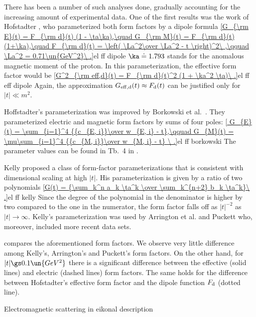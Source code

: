 There has been a number of such analyses done, gradually accounting for the increasing amount of experimental data. One of the first results was the work of Hofstadter , who parameterized both form factors by a dipole formula
\eqref{G_{\rm E}(t) = F_{\rm d}(t) (1 - \ta\ka),\quad G_{\rm M}(t) = F_{\rm d}(t) (1+\ka),\quad F_{\rm d}(t) = \left( \La^2\over \La^2 - t \right)^2\ ,\qquad \La^2 = 0.71\un{GeV^2}\ .}{el ff dipole}
$\ka\doteq 1.793$ stands for the anomalous magnetic moment of the proton. In this parameterization, the effective form factor would be
\eqref{G^2_{\rm eff,d}(t) = F_{\rm d}(t)^2 (1 + \ka^2 \ta)\ .}{el ff eff dipole}
Again, the approximation $G_{\rm eff,d}(t)\approx F_{\rm d}(t)$ can be justified only for $|t| \ll m^2$.

Hoffstadter's parameterization was improved by Borkowski et al.~. They parameterized electric and magnetic form factors by sums of four poles:
\eqref{
G_{E}(t) = \sum_{i=1}^4 {{c_{E, i}}\over w_{E, i} - t},\qquad
G_{M}(t) = \mu\sum_{i=1}^4 {{c_{M, i}}\over w_{M, i} - t}
\ .}{el ff borkowski}
The parameter values can be found in Tb.~4 in .

Kelly  proposed a class of form-factor parameterizations that is consistent with dimensional scaling at high $|t|$. His parameterization is given by a ratio of two polynomials
\eqref{G(t) = {\sum_k^n a_k \ta^k \over \sum_k^{n+2} b_k \ta^k}\ .}{el ff kelly}
Since the degree of the polynomial in the denominator is higher by two compared to the one in the numerator, the form factor falls off as $|t|^{-2}$ as $|t|\to\infty$. Kelly's parameterization was used by Arrington et al.  and Puckett  who, moreover, included more recent data sets.

 compares the aforementioned form factors. We observe very little difference among Kelly's, Arrington's and Puckett's form factors. On the other hand, for $|t| \gs 0.1\un{GeV^2}$ there is a significant difference between the effective (solid lines) and electric (dashed lines) form factors. The same holds for the difference between Hofstadter's effective form factor and the dipole function $F_{\rm d}$ (dotted line).


\caption{Electromagnetic scattering in eikonal description}

